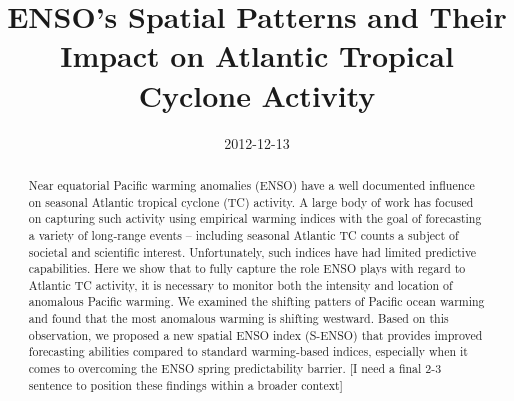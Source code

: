\documentclass[]{article}
\title{ENSO's Spatial Patterns and Their Impact on Atlantic Tropical Cyclone Activity}
\date{2012-12-13}
\begin{document}
\maketitle
\begin{abstract}
Near equatorial Pacific warming anomalies (ENSO) have a well documented influence on seasonal Atlantic tropical cyclone (TC) activity. A large body of work has focused on capturing such activity using empirical warming indices with the goal of forecasting a variety of long-range events -- including seasonal Atlantic TC counts a subject of societal and scientific interest. Unfortunately, such indices have had limited predictive capabilities. Here we show that to fully capture the role ENSO plays with regard to Atlantic TC activity, it is necessary to monitor both the intensity and location of anomalous Pacific warming. We examined the shifting patters of Pacific ocean warming and found that the most anomalous warming is shifting westward. Based on this observation, we proposed a new spatial ENSO index (S-ENSO) that provides improved forecasting abilities compared to standard warming-based indices, especially when it comes to overcoming the ENSO spring predictability barrier. [I need a final 2-3 sentence to position these findings within a broader context]
\end{abstract}



%

%
%
%
%





\end{document}
